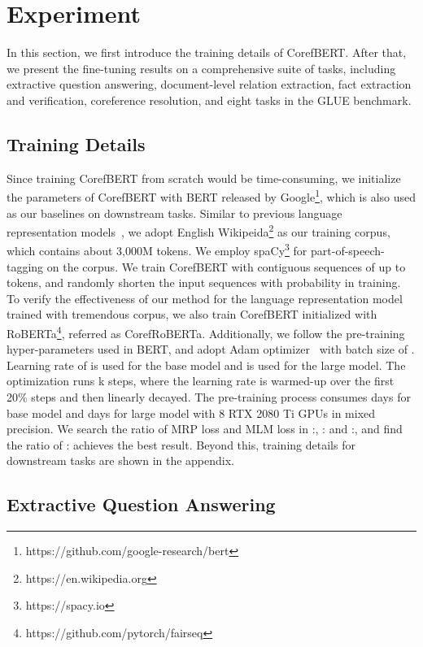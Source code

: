 \documentclass[11pt,a4paper]{article}
\newcommand\CorefBERT{CorefBERT\xspace}
\begin{document}
\section{Experiment}
In this section, we first introduce the training details of  \CorefBERT. After that, we present the fine-tuning results on a comprehensive suite of tasks, including extractive question answering, document-level relation extraction, fact extraction and verification, coreference resolution, and eight tasks in the GLUE benchmark.

\subsection{Training Details}
Since training \CorefBERT from scratch would be time-consuming, we initialize the parameters of \CorefBERT with BERT  released by Google\footnote{{https://github.com/google-research/bert}}, which is also used as our baselines on  downstream tasks. 
Similar to previous language representation models~\citep{BERT, Spanbert}, we adopt English Wikipeida\footnote{{https://en.wikipedia.org}} as our training corpus, which contains about 3,000M tokens.  We employ {spaCy}\footnote{{https://spacy.io}} for part-of-speech-tagging on the corpus. 
We train CorefBERT with contiguous sequences of up to  tokens, and randomly shorten the input sequences with  probability in training.   To verify the effectiveness of our method for the language representation model trained with tremendous corpus, we also train CorefBERT initialized with RoBERTa\footnote{{https://github.com/pytorch/fairseq}}, referred as CorefRoBERTa.
Additionally, we follow the pre-training hyper-parameters used in BERT, and adopt Adam optimizer~\citep{Adam}  with batch size of .  Learning rate of  is used for the base model and  is used for the large model. The optimization runs k steps, 
where the learning rate is warmed-up over the first 20\% steps and then linearly decayed.
The pre-training process consumes  days for base model and  days for large model with 8 RTX 2080 Ti GPUs in mixed precision. We search the ratio of MRP loss and MLM loss in :, : and :, and find the ratio of : achieves the best result. Beyond this, training details for downstream tasks are shown in the appendix. 



\subsection{Extractive Question Answering}
\end{document}
